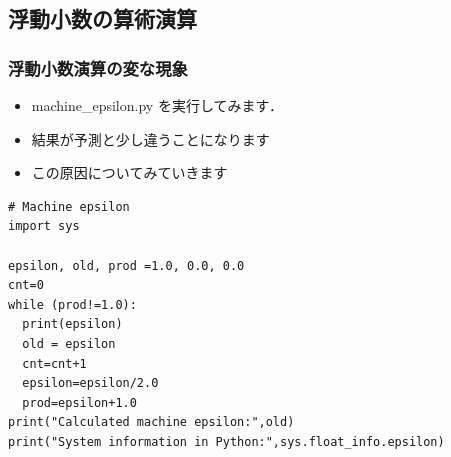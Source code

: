 \subsection{浮動小数の算術演算}
\begin{frame}
\frametitle{浮動小数演算の変な現象}
  \begin{itemize}
\item machine\_epsilon.py を実行してみます．
\item 結果が予測と少し違うことになります
\item この原因についてみていきます
  \end{itemize}
  \begin{lstlisting}[caption={machine\_epsilon.py}]
# Machine epsilon
import sys

epsilon, old, prod =1.0, 0.0, 0.0
cnt=0
while (prod!=1.0):
  print(epsilon)
  old = epsilon
  cnt=cnt+1
  epsilon=epsilon/2.0
  prod=epsilon+1.0
print("Calculated machine epsilon:",old)
print("System information in Python:",sys.float_info.epsilon)
  \end{lstlisting}
\end{frame}
